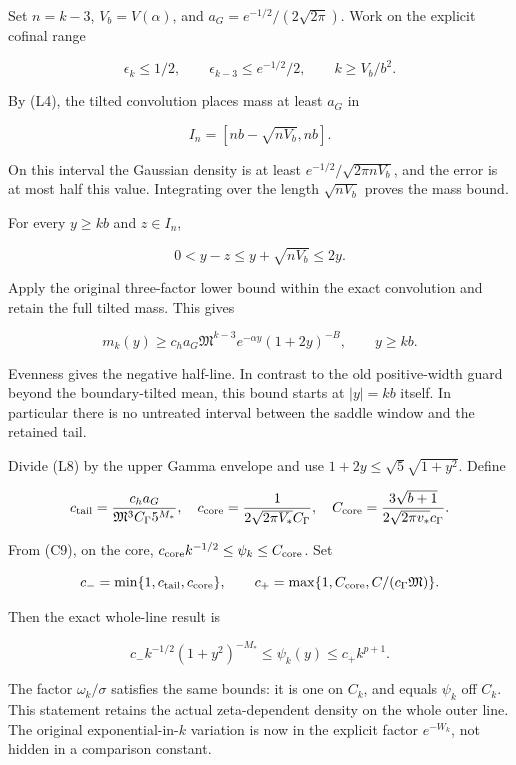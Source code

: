 \documentclass[11pt,a4paper]{article}
\begin{document}
Set \(n=k-3\), \(V_b=V(\alpha)\), and
\(a_G=e^{-1/2}/(2\sqrt{2\pi})\). Work on the explicit cofinal range

\[
\epsilon_k\le1/2,\qquad
\epsilon_{k-3}\le e^{-1/2}/2,\qquad
k\ge V_b/b^2.
\tag{L7}
\]

By (L4), the tilted convolution places mass at least \(a_G\) in

\[
I_n=[nb-\sqrt{nV_b},nb].
\]

On this interval the Gaussian density is at least
\(e^{-1/2}/\sqrt{2\pi nV_b}\), and the error is at most half this value. Integrating over the length \(\sqrt{nV_b}\) proves the mass bound.

For every \(y\ge kb\) and \(z\in I_n\),

\[
0<y-z\le y+\sqrt{nV_b}\le2y.
\]

Apply the original three-factor lower bound within the exact convolution and retain the full tilted mass. This gives

\[
\boxed{m_k(y)\ge c_h a_G\mathfrak M^{k-3}e^{-\alpha y}(1+2y)^{-B},
\qquad y\ge kb.}
\tag{L8}
\]

Evenness gives the negative half-line. In contrast to the old positive-width guard beyond the boundary-tilted mean, this bound starts at \(|y|=kb\) itself. In particular there is no untreated interval between the saddle window and the retained tail.

Divide (L8) by the upper Gamma envelope and use
\(1+2y\le\sqrt5\sqrt{1+y^2}\). Define

\[
c_{\rm tail}=\frac{c_h a_G}{\mathfrak M^3C_\Gamma 5^{M_*}},
\quad
c_{\rm core}=\frac1{2\sqrt{2\pi V_*}C_\Gamma},
\quad
C_{\rm core}=\frac{3\sqrt{b+1}}{2\sqrt{2\pi v_*}c_\Gamma}.
\]

From (C9), on the core,
\(c_{\rm core}k^{-1/2}\le\psi_k\le C_{\rm core}\). Set

\[
c_- =\min\{1,c_{\rm tail},c_{\rm core}\},\qquad
c_+=\max\{1,C_{\rm core},C/(c_\Gamma\mathfrak M)\}.
\]

Then the exact whole-line result is

\[
\boxed{c_-k^{-1/2}(1+y^2)^{-M_*}\le\psi_k(y)
\le c_+k^{p+1}.}
\tag{L9}
\]

The factor \(\omega_k/\sigma\) satisfies the same bounds: it is one on \(C_k\), and equals \(\psi_k\) off \(C_k\). This statement retains the actual zeta-dependent density on the whole outer line. The original exponential-in-\(k\) variation is now in the explicit factor \(e^{-W_k}\), not hidden in a comparison constant.
\end{document}
